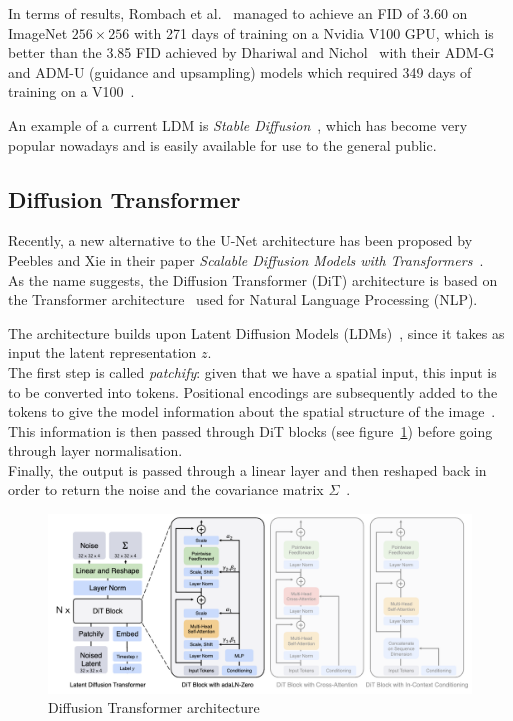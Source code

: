 \documentclass[twoside]{article}
\numberwithin{equation}{section}
\numberwithin{figure}{section}
\begin{document}
In terms of results, Rombach et al.~\cite{rombach2022highresolution} managed to achieve an FID of 3.60 on ImageNet $256 \times 256$ with 271 days of training on a Nvidia V100 GPU, which is better than the 3.85 FID achieved by Dhariwal and Nichol~\cite{dhariwal2021diffusion} with their ADM-G and ADM-U (guidance and upsampling) models which required 349 days of training on a V100~\cite{rombach2022highresolution}.

An example of a current LDM is \textit{Stable Diffusion}~\cite{stablediffusion, rombach2022highresolution}, which has become very popular nowadays and is easily available for use to the general public.

\subsection{Diffusion Transformer}
Recently, a new alternative to the U-Net architecture has been proposed by Peebles and Xie in their paper \textit{Scalable Diffusion Models with Transformers}~\cite{peebles2023scalable}. \\
As the name suggests, the Diffusion Transformer (DiT) architecture is based on the Transformer architecture~\cite{vaswani2023attention} used for Natural Language Processing (NLP).

The architecture builds upon Latent Diffusion Models (LDMs)~\cite{rombach2022highresolution}, since it takes as input the latent representation $z$. \\
The first step is called \textit{patchify}: given that we have a spatial input, this input is to be converted into tokens.
Positional encodings are subsequently added to the tokens to give the model information about the spatial structure of the image~\cite{peebles2023scalable}. \\
This information is then passed through DiT blocks (see figure~\ref{fig:DiT}) before going through layer normalisation. \\
Finally, the output is passed through a linear layer and then reshaped back in order to return the noise and the covariance matrix $\Sigma$~\cite{peebles2023scalable}.
\begin{figure}[h]
  \begin{center}
    \includegraphics[width=\textwidth]{images/DiT.png}
    \caption{Diffusion Transformer architecture~\cite{peebles2023scalable}}
    \label{fig:DiT}
  \end{center}
\end{figure}
\end{document}
